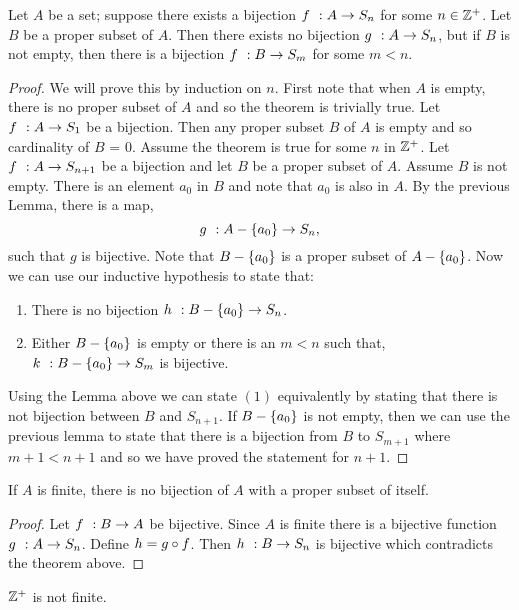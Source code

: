 \begin{Theorem}
    Let $A$ be a set; suppose there exists a bijection ${f}\hspace{0.05in}:{A}\to{S_n}$ for some $n \in\mathbb{Z}^{+}$. Let $B$ be a
    proper subset of $A$. Then there exists no bijection ${g}\hspace{0.05in}:{A}\to{S_n}$, but if $B$ is not empty, then
    there is a bijection ${f}\hspace{0.05in}:{B}\to{S_m}$ for some $m < n$.
\end{Theorem}
\begin{proof}
    We will prove this by induction on $n$. First note that when $A$ is empty, there is no proper subset of
    $A$ and so the theorem is trivially true. Let ${f}\hspace{0.05in}:{A}\to{S_1}$ be a bijection. Then any proper subset $B$
    of $A$ is empty and so cardinality of $B$ = $0$.
    Assume the theorem is true for some $n$ in $\mathbb{Z}^{+}$. Let ${f}\hspace{0.05in}:{A}\to{S_{n+1}}$ be a bijection and let $B$
    be a proper subset of $A$. Assume $B$ is not empty. There is an element $a_0$ in $B$ and note that $a_0$
    is also in $A$. By the previous Lemma, there is a map,
    \[{g}\hspace{0.05in}:{A-\left\lbrace{a_0}\right\rbrace}\to{S_n},\]
    such that $g$ is bijective. Note that $B - \left\lbrace{a_0}\right\rbrace$ is a proper subset of $A - \left\lbrace{a_0}\right\rbrace$. 
    Now we can use our inductive hypothesis to state that:
    \begin{enumerate}
	\item
	    There is no bijection ${h}\hspace{0.05in}:{B-\left\lbrace{a_0}\right\rbrace}\to{S_n}$.
	\item
	    Either $B - \left\lbrace{a_0}\right\rbrace$ is empty or there is an $m < n$ such that,
	    ${k}\hspace{0.05in}:{B-\left\lbrace{a_0}\right\rbrace}\to{S_{m}}$ is bijective.
    \end{enumerate}
    Using the Lemma above we can state $(1)$ equivalently by stating that there is not bijection between $B$
    and $S_{n+1}$. If $B - \left\lbrace{a_0}\right\rbrace$ is not empty, then we can use the previous lemma to state that there is
    a bijection from $B$ to $S_{m+1}$ where $m+1 < n+1$ and so we have proved the statement for $n+1$.
\end{proof}
\begin{Corollary}
    If $A$ is finite, there is no bijection of $A$ with a proper subset of itself.
\end{Corollary}
\begin{proof}
    Let ${f}\hspace{0.05in}:{B}\to{A}$ be bijective. Since $A$ is finite there is a bijective function ${g}\hspace{0.05in}:{A}\to{S_n}$.
    Define $h = {g}\circ{f}$. Then ${h}\hspace{0.05in}:{B}\to{S_n}$ is bijective which contradicts the theorem above.
\end{proof}
\begin{Corollary}
    $\mathbb{Z}^{+}$ is not finite.
\end{Corollary}
